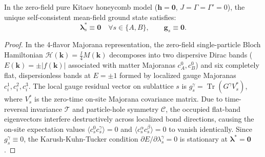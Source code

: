 \begin{theorem}
\label{thm:flat_band_neutrality}
In the zero-field pure Kitaev honeycomb model ($\mathbf{h} = \mathbf{0}$, $J=\Gamma=\Gamma'=0$), the unique self-consistent mean-field ground state satisfies:
\begin{equation}
\boldsymbol{\lambda}_s^* \equiv \mathbf{0} \quad \forall s \in \{A, B\}, \qquad \mathbf{g}_s \equiv \mathbf{0}.
\end{equation}
\end{theorem}
\begin{proof}
In the 4-flavor Majorana representation, the zero-field single-particle Bloch Hamiltonian $\mathcal{H}(\mathbf{k}) = \frac{\ii}{4} M(\mathbf{k})$ decomposes into two dispersive Dirac bands ($E(\mathbf{k}) = \pm |f(\mathbf{k})|$ associated with matter Majoranas $c_A^0, c_B^0$) and six completely flat, dispersionless bands at $E = \pm 1$ formed by localized gauge Majoranas $c_i^1, c_i^2, c_i^3$.
The local gauge residual vector on sublattice $s$ is $g_s^\gamma = \operatorname{Tr}(G^\gamma V_s^*)$, where $V_s^*$ is the zero-time on-site Majorana covariance matrix. Due to time-reversal invariance $\mathcal{T}$ and particle-hole symmetry $\mathcal{C}$, the occupied flat-band eigenvectors interfere destructively across localized bond directions, causing the on-site expectation values $\langle c_s^0 c_s^\gamma \rangle = 0$ and $\langle c_s^\alpha c_s^\beta \rangle = 0$ to vanish identically. Since $g_s^\gamma \equiv 0$, the Karush-Kuhn-Tucker condition $\partial E / \partial \lambda_s^\gamma = 0$ is stationary at $\boldsymbol{\lambda}^* = \mathbf{0}$.
\end{proof}

